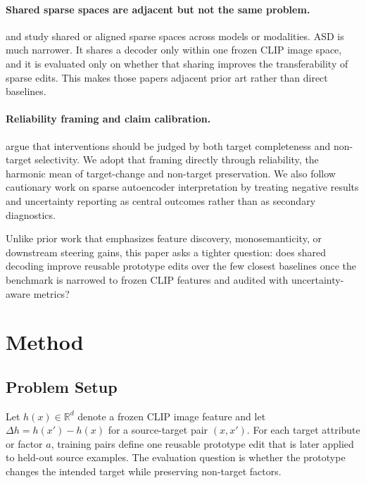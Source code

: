 \documentclass{article}
\newcommand{\R}{\mathbb{R}}
\begin{document}
\paragraph{Shared sparse spaces are adjacent but not the same problem.}
\citet{nasirisarvi2025sparc} and \citet{gu2026lucid} study shared or aligned sparse spaces across models or modalities. ASD is much narrower. It shares a decoder only within one frozen CLIP image space, and it is evaluated only on whether that sharing improves the transferability of sparse edits. This makes those papers adjacent prior art rather than direct baselines.

\paragraph{Reliability framing and claim calibration.}
\citet{canby2024reliable} argue that interventions should be judged by both target completeness and non-target selectivity. We adopt that framing directly through reliability, the harmonic mean of target-change and non-target preservation. We also follow cautionary work on sparse autoencoder interpretation \citep{leask2025canonical, jedryszek2026stable} by treating negative results and uncertainty reporting as central outcomes rather than as secondary diagnostics.

Unlike prior work that emphasizes feature discovery, monosemanticity, or downstream steering gains, this paper asks a tighter question: does shared decoding improve reusable prototype edits over the few closest baselines once the benchmark is narrowed to frozen CLIP features and audited with uncertainty-aware metrics?

\section{Method}
\label{sec:method}

\subsection{Problem Setup}

Let $h(x) \in \R^d$ denote a frozen CLIP image feature and let $\Delta h = h(x') - h(x)$ for a source-target pair $(x,x')$. For each target attribute or factor $a$, training pairs define one reusable prototype edit that is later applied to held-out source examples. The evaluation question is whether the prototype changes the intended target while preserving non-target factors.
\end{document}
